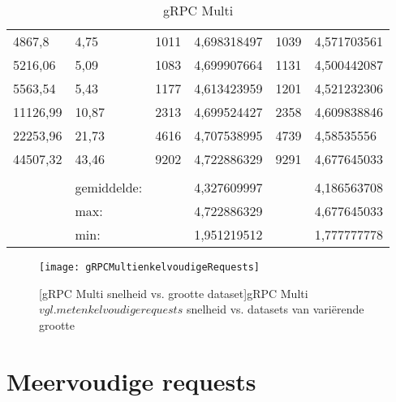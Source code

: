 \begin{table}
\begin{tabular}{llllll}
        4867,8 & 4,75 & 1011 & 4,698318497 & 1039 & 4,571703561 \\
        5216,06 & 5,09 & 1083 & 4,699907664 & 1131 & 4,500442087 \\
        5563,54 & 5,43 & 1177 & 4,613423959 & 1201 & 4,521232306 \\
        11126,99 & 10,87 & 2313 & 4,699524427 & 2358 & 4,609838846 \\
        22253,96 & 21,73 & 4616 & 4,707538995 & 4739 & 4,58535556 \\
        44507,32 & 43,46 & 9202 & 4,722886329 & 9291 & 4,677645033 \\
         &  &  &  &  &  \\
         & gemiddelde: &  & 4,327609997 &  & 4,186563708 \\
         & max: &  & 4,722886329 &  & 4,677645033 \\
         & min: &  & 1,951219512 &  & 1,777777778 \\
        \bottomrule
    \end{tabular}
    \caption{gRPC Multi}
    \label{tab:gRPCMultienkelvoudigtabel}
\end{table}

\begin{figure}[ht]
    \centering
    \texttt{[image: gRPCMultienkelvoudigeRequests]}
    \caption{[gRPC Multi snelheid vs. grootte dataset]gRPC Multi \(vgl. met enkelvoudige requests\) snelheid vs. datasets van vari\"erende grootte}
    \label{fig:gRPCMultienkelvoudigeRequestsFig}
\end{figure}

\section{Meervoudige requests}